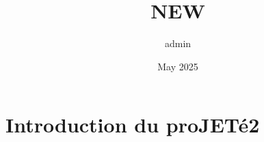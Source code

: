 \documentclass{article}
\title{NEW}
\author{admin }
\date{May 2025}
\begin{document}
\maketitle

\section{Introduction du proJETé2}
\end{document}
